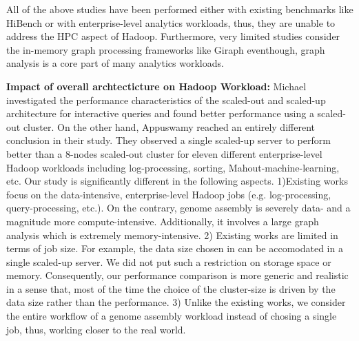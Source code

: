 \documentclass[conference]{IEEEtran}
\begin{document}
All of the above studies have been performed either with existing benchmarks like HiBench \cite{bm:hibench} or with enterprise-level analytics workloads, thus, they are unable to address the HPC aspect of Hadoop. 
Furthermore, very limited studies consider the in-memory graph processing frameworks like Giraph eventhough, graph analysis is a core part of many analytics workloads. 

\textbf{Impact of overall archtecticture on Hadoop Workload:}
Michael \cite{scaleupscaleout:michael} investigated the performance characteristics of the scaled-out and scaled-up architecture for interactive queries and found better performance using a scaled-out cluster. 
On the other hand, Appuswamy \cite{scaleupscaleout:appuswamy} reached an entirely different conclusion in their study. 
They observed a single scaled-up server to perform better than a 8-nodes scaled-out cluster for eleven different enterprise-level Hadoop workloads including log-processing, sorting, Mahout-machine-learning, etc. 
Our study is significantly different in the following aspects. 
1)Existing works focus on the data-intensive, enterprise-level Hadoop jobs (e.g. log-processing, query-processing, etc.). On the contrary, genome assembly is severely data- and a magnitude more compute-intensive. Additionally, it involves a large graph analysis which is extremely memory-intensive. 
2) Existing works are limited in terms of job size. For example, the data size chosen in \cite{scaleupscaleout:appuswamy} can be accomodated in a single scaled-up server. We did not put such a restriction on storage space or memory. Consequently, our performance comparison is more generic and realistic in a sense that, most of the time the choice of the cluster-size is driven by the data size rather than the performance. 
3) Unlike the existing works, we consider the entire workflow of a genome assembly workload instead of chosing a single job, thus, working closer to the real world. 

\end{document}
